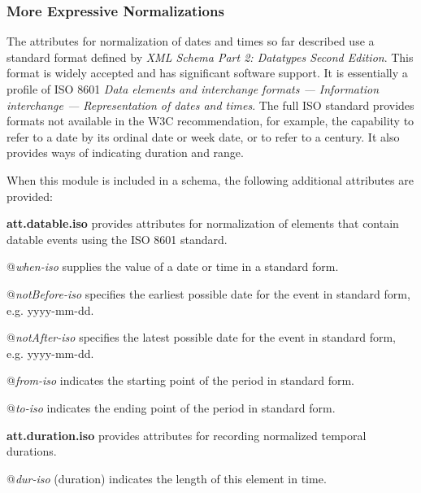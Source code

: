 \subsubsection[{More Expressive Normalizations}]{More Expressive Normalizations}\label{NDDATEISO}\par
The attributes for normalization of dates and times so far described use a standard format defined by \textit{XML Schema Part 2: Datatypes Second Edition}. This format is widely accepted and has significant software support. It is essentially a profile of ISO 8601 \textit{Data elements and interchange formats — Information interchange — Representation of dates and times}. The full ISO standard provides formats not available in the W3C recommendation, for example, the capability to refer to a date by its ordinal date or week date, or to refer to a century. It also provides ways of indicating duration and range.\par
When this module is included in a schema, the following additional attributes are provided: 
\begin{sansreflist}
  
\item [\textbf{att.datable.iso}] provides attributes for normalization of elements that contain datable events using the ISO 8601 standard.\hfil\\[-10pt]\begin{sansreflist}
    \item[@{\itshape when-iso}]
  supplies the value of a date or time in a standard form.
    \item[@{\itshape notBefore-iso}]
  specifies the earliest possible date for the event in standard form, e.g. yyyy-mm-dd.
    \item[@{\itshape notAfter-iso}]
  specifies the latest possible date for the event in standard form, e.g. yyyy-mm-dd.
    \item[@{\itshape from-iso}]
  indicates the starting point of the period in standard form.
    \item[@{\itshape to-iso}]
  indicates the ending point of the period in standard form.
\end{sansreflist}  
\item [\textbf{att.duration.iso}] provides attributes for recording normalized temporal durations.\hfil\\[-10pt]\begin{sansreflist}
    \item[@{\itshape dur-iso}]
  (duration) indicates the length of this element in time.
\end{sansreflist}  
\end{sansreflist}
